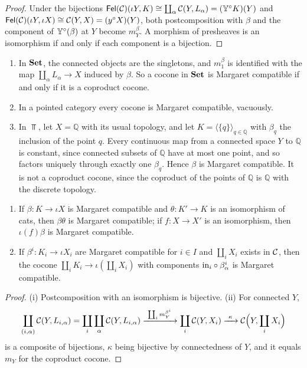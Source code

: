 \begin{proof}
Under the bijections $\mathsf{Fel}(\mathcal{C})(\iota Y,K)\cong\coprod_\alpha\mathcal{C}(Y,L_\alpha)=(\mathbb{Y}^\circ K)(Y)$
and $\mathsf{Fel}(\mathcal{C})(\iota Y,\iota X)\cong\mathcal{C}(Y,X)=(y^\circ X)(Y)$, both postcomposition
with $\beta$ and the component of $\mathbb{Y}^\circ(\beta)$ at $Y$ become $m^\beta_Y$.
A morphism of presheaves is an isomorphism if and only if each component is a
bijection.
\end{proof}

\begin{example}\label{ex:margaret}
\begin{enumerate}
\item In $\mathbf{Set}$, the connected objects are the singletons, and $m^\beta_1$ is
  identified with the map $\coprod_\alpha L_\alpha\to X$ induced by $\beta$. So
  a cocone in $\mathbf{Set}$ is Margaret compatible if and only if it is a coproduct
  cocone.
\item In a pointed category every cocone is Margaret compatible, vacuously.
\item In $\Top$, let $X=\mathbb Q$ with its usual topology, and let
  $K=\langle\{q\}\rangle_{q\in\mathbb Q}$ with $\beta_q$ the inclusion of the point
  $q$. Every continuous map from a connected space $Y$ to $\mathbb Q$ is constant,
  since connected subsets of $\mathbb Q$ have at most one point, and so factors
  uniquely through exactly one $\beta_q$. Hence $\beta$ is Margaret compatible.
  It is not a coproduct cocone, since the coproduct of the points of $\mathbb Q$
  is $\mathbb Q$ with the discrete topology.
\end{enumerate}
\end{example}

\begin{proposition}\label{prop:margaret-closure}
\begin{enumerate}
\item If $\beta\colon K\to\iota X$ is Margaret compatible and $\theta\colon K'\to K$
  is an isomorphism of cats, then $\beta\theta$ is Margaret compatible; if
  $f\colon X\to X'$ is an isomorphism, then $\iota(f)\beta$ is Margaret compatible.
\item If $\beta^i\colon K_i\to\iota X_i$ are Margaret compatible for $i\in I$ and
  $\coprod_iX_i$ exists in $\mathcal{C}$, then the cocone
  $\coprod_iK_i\to\iota(\coprod_iX_i)$ with components $\mathrm{in}_i\circ\beta^i_\alpha$
  is Margaret compatible.
\end{enumerate}
\end{proposition}

\begin{proof}
(i) Postcomposition with an isomorphism is bijective. (ii) For connected $Y$,
\[
\coprod_{(i,\alpha)}\cC(Y,L_{i,\alpha})=\coprod_i\coprod_\alpha\cC(Y,L_{i,\alpha})
\xrightarrow{\ \coprod_im^{\beta^i}_Y\ }\coprod_i\cC(Y,X_i)\xrightarrow{\ \kappa\ }\cC\Bigl(Y,\coprod_iX_i\Bigr)
\]
is a composite of bijections, $\kappa$ being bijective by connectedness of $Y$,
and it equals $m_Y$ for the coproduct cocone.
\end{proof}

